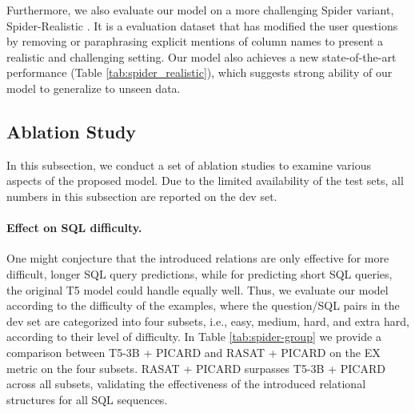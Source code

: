 \documentclass[11pt]{article}
\begin{document}
Furthermore, we also evaluate our model on a more challenging Spider variant, Spider-Realistic \citep{deng-etal-2021-structure}. It is a evaluation dataset that has modified the user questions by removing or paraphrasing explicit mentions of column names to present a realistic and challenging setting. Our model also achieves a new state-of-the-art performance (Table \ref{tab:spider_realistic}), which suggests strong ability of our model to generalize to unseen data.






\subsection{Ablation Study}
In this subsection, we conduct a set of ablation studies to examine various aspects of the proposed model. Due to the limited availability of the test sets, all numbers in this subsection are reported on the dev set. 
\paragraph{Effect on SQL difficulty.} One might conjecture that the introduced relations are only effective for more difficult, longer SQL query predictions, while for predicting short SQL queries, the original T5 model could handle equally well. Thus, we evaluate our model according to the difficulty of the examples, where the question/SQL pairs in the dev set are categorized into four subsets, i.e., easy, medium, hard, and extra hard, according to their level of difficulty. In Table \ref{tab:spider-group} we provide a comparison between T5-3B + PICARD \citep{scholak-etal-2021-picard} and RASAT + PICARD on the EX metric on the four subsets. RASAT + PICARD surpasses T5-3B + PICARD across all subsets, validating the effectiveness of the introduced relational structures for all SQL sequences. 


\begin{table}
\caption{EX accuracy of RASAT+PICARD and T5-3B+PICARD on the examples of Spider dev set with different levels of difficulty.}
\label{tab:spider-group}
\end{table}
\end{document}
